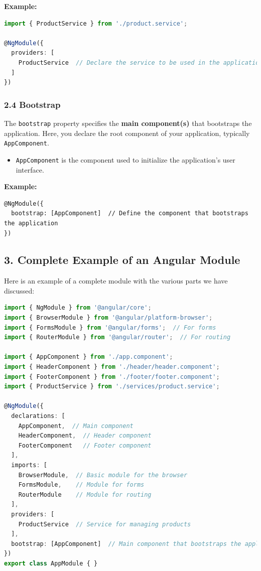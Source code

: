 \documentclass{article}
\begin{document}
\textbf{Example:}  
\begin{lstlisting}[language=TypeScript, caption={Using a service in a component}, label={lst:typescript-service-usage}]
import { ProductService } from './product.service';

@NgModule({
  providers: [
    ProductService  // Declare the service to be used in the application
  ]
})
\end{lstlisting}

\subsubsection*{2.4 Bootstrap}
The \texttt{bootstrap} property specifies the \textbf{main component(s)} that bootstraps the application. Here, you declare the root component of your application, typically \texttt{AppComponent}.

\begin{itemize}
    \item \texttt{AppComponent} is the component used to initialize the application's user interface.
\end{itemize}

\textbf{Example:}  
\begin{verbatim}
@NgModule({
  bootstrap: [AppComponent]  // Define the component that bootstraps the application
})
\end{verbatim}

\subsection*{3. Complete Example of an Angular Module}

Here is an example of a complete module with the various parts we have discussed:

\begin{lstlisting}[language=TypeScript, caption={Using a service in a component}, label={lst:typescript-service-usage}]
import { NgModule } from '@angular/core';
import { BrowserModule } from '@angular/platform-browser';
import { FormsModule } from '@angular/forms';  // For forms
import { RouterModule } from '@angular/router';  // For routing

import { AppComponent } from './app.component';
import { HeaderComponent } from './header/header.component';
import { FooterComponent } from './footer/footer.component';
import { ProductService } from './services/product.service';

@NgModule({
  declarations: [
    AppComponent,  // Main component
    HeaderComponent,  // Header component
    FooterComponent   // Footer component
  ],
  imports: [
    BrowserModule,  // Basic module for the browser
    FormsModule,    // Module for forms
    RouterModule    // Module for routing
  ],
  providers: [
    ProductService  // Service for managing products
  ],
  bootstrap: [AppComponent]  // Main component that bootstraps the application
})
export class AppModule { }
\end{lstlisting}
\end{document}
